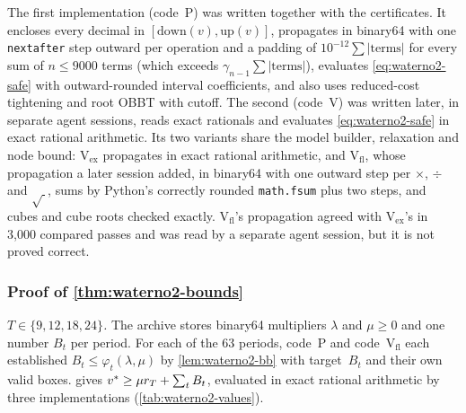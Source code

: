 The first implementation (code~P) was written together with the certificates.
It encloses every decimal in $[\mathrm{down}(v),\mathrm{up}(v)]$, propagates in binary64 with one \texttt{nextafter} step outward per operation and a padding of $10^{-12}\sum|\text{terms}|$ for every sum of $n\le9000$ terms (which exceeds $\gamma_{n-1}\sum|\text{terms}|$), evaluates \eqref{eq:waterno2-safe} with outward-rounded interval coefficients, and also uses reduced-cost tightening and root OBBT with cutoff.
The second (code~V) was written later, in separate agent sessions, reads exact rationals and evaluates \eqref{eq:waterno2-safe} in exact rational arithmetic.
Its two variants share the model builder, relaxation and node bound: V$_{\mathrm{ex}}$ propagates in exact rational arithmetic, and V$_{\mathrm{fl}}$, whose propagation a later session added, in binary64 with one outward step per $\times$, $\div$ and $\sqrt{\ }$, sums by Python's correctly rounded \texttt{math.fsum} plus two steps, and cubes and cube roots checked exactly.
V$_{\mathrm{fl}}$'s propagation agreed with V$_{\mathrm{ex}}$'s in 3,000 compared passes and was read by a separate agent session, but it is not proved correct.

\subsubsection{Proof of \texorpdfstring{\cref{thm:waterno2-bounds}}{the waterno2 theorem}}\label{app:waterno2-proof}

\emph{$T\in\{9,12,18,24\}$.}
The archive stores binary64 multipliers $\lambda$ and $\mu\ge0$ and one number $B_t$ per period.
For each of the 63 periods, code~P and code~V$_{\mathrm{fl}}$ each established $B_t\le\varphi_t(\lambda,\mu)$ by \cref{lem:waterno2-bb} with target~$B_t$ and their own valid boxes.
 gives $v^{*}\ge\mu r_T+\sum_tB_t$, evaluated in exact rational arithmetic by three implementations (\cref{tab:waterno2-values}).

